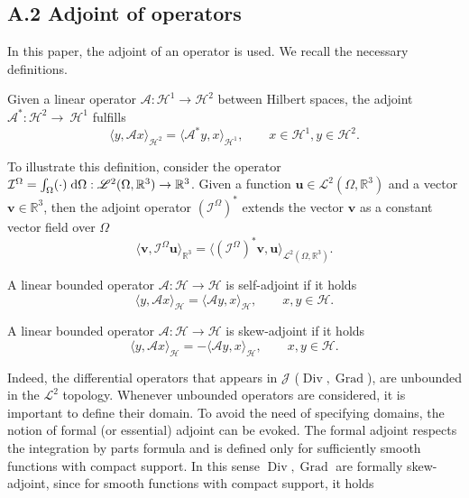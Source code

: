 \documentclass{svjour3}                     %
\DeclareMathOperator*{\Grad}{Grad}
\DeclareMathOperator*{\Div}{Div}
\begin{document}
\subsection*{\normalsize \textbf{A.2 Adjoint of operators}}
In this paper, the adjoint of an operator is used. We recall the necessary definitions.
\begin{definition}
	Given a linear operator $\mathcal{A}: \mathscr{H}^1 \rightarrow \mathscr{H}^2$ between Hilbert spaces, the adjoint $\mathcal{A}^*:\mathscr{H}^2\rightarrow~\mathscr{H}^1$ fulfills 
	\begin{equation}
	\langle y, \mathcal{A}x \rangle_{\mathscr{H}^2} = \langle \mathcal{A}^* y, x \rangle_{\mathscr{H}^1}, \qquad x \in \mathscr{H}^1, y \in \mathscr{H}^2.
	\end{equation}
\end{definition}
To illustrate this definition, consider the operator $\mathcal{I}^\Omega = \int_\Omega (\cdot) \d\Omega : \mathscr{L}^2(\Omega, \mathbb{R}^3) \rightarrow \mathbb{R}^3$. Given a function $\bm{u} \in \mathscr{L}^2(\Omega, \mathbb{R}^3)$ and a vector $\bm{v} \in \mathbb{R}^3$, then the adjoint operator $(\mathcal{I}^\Omega)^*$ extends the vector $\bm{v}$ as a constant vector field over $\Omega$
\begin{equation*} 
\langle \bm{v}, \mathcal{I}^\Omega \bm{u} \rangle_{\mathbb{R}^3} = \langle (\mathcal{I}^\Omega)^* \bm{v},  \bm{u} \rangle_{\mathscr{L}^2(\Omega, \mathbb{R}^3)}. 
\end{equation*}
\begin{definition}
	A linear bounded operator $\mathcal{A}: \mathscr{H} \rightarrow \mathscr{H}$ is self-adjoint if it holds
	\begin{equation}
	\langle y, \mathcal{A}x \rangle_{\mathscr{H}} = \langle \mathcal{A} y, x \rangle_{\mathscr{H}}, \qquad x, y \in \mathscr{H}.
	\end{equation}
\end{definition}
\begin{definition}
	A linear bounded operator $\mathcal{A}: \mathscr{H} \rightarrow \mathscr{H}$ is  skew-adjoint if it holds
	\begin{equation}
	\langle y, \mathcal{A}x \rangle_{\mathscr{H}} = -\langle \mathcal{A} y, x \rangle_{\mathscr{H}}, \qquad x, y \in \mathscr{H}.
	\end{equation}	
\end{definition}
Indeed, the differential operators that appears in $\bm{\mathcal{J}}$ ($\Div, \Grad$), are unbounded in the $\mathscr{L}^2$ topology. Whenever unbounded operators are considered, it is important to define their domain. To avoid the need of specifying domains, the notion of formal (or essential) adjoint can be evoked. The formal adjoint respects the integration by parts formula and is defined only for sufficiently smooth functions with compact support. In this sense $\Div, \Grad$ are formally skew-adjoint, since for smooth functions with compact support, it holds
\end{document}

